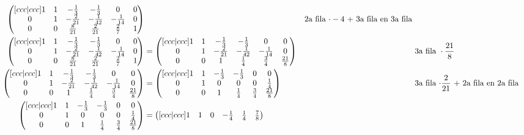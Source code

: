 \documentclass[letterpaper]{article}
\renewcommand{\*}{\cdot}
\theoremstyle{definition}
\begin{document}
\begin{align*}
\begin{pmatrix}[ccc|ccc]
	1 & 1 & -\frac{1}{3} & -\frac{1}{3} & 0 & 0\\
	0 & 1 & -\frac{2}{21} & -\frac{1}{42} & -\frac{1}{14} & 0\\
	0 & 0 & \frac{8}{21} & \frac{2}{21} & \frac{2}{7} & 1
	\end{pmatrix}  && \text{2a fila $ \* -4 $ + 3a fila en 3a fila } \\
	\begin{pmatrix}[ccc|ccc]
	1 & 1 & -\frac{1}{3} & -\frac{1}{3} & 0 & 0\\
	0 & 1 & -\frac{2}{21} & -\frac{1}{42} & -\frac{1}{14} & 0\\
	0 & 0 & \frac{8}{21} & \frac{2}{21} & \frac{2}{7} & 1
	\end{pmatrix}  & = \begin{pmatrix}[ccc|ccc]
	1 & 1 & -\frac{1}{3} & -\frac{1}{3} & 0 & 0\\
	0 & 1 & -\frac{2}{21} & -\frac{1}{42} & -\frac{1}{14} & 0\\
	0 & 0 & 1 & \frac{1}{4} & \frac{3}{4} & \frac{21}{8}
	\end{pmatrix}  && \text{3a fila } \* \frac{21}{8}\\
	\begin{pmatrix}[ccc|ccc]
	1 & 1 & -\frac{1}{3} & -\frac{1}{3} & 0 & 0\\
	0 & 1 & -\frac{2}{21} & -\frac{1}{42} & -\frac{1}{14} & 0\\
	0 & 0 & 1 & \frac{1}{4} & \frac{3}{4} & \frac{21}{8}
	\end{pmatrix} &= \begin{pmatrix}[ccc|ccc]
	1 & 1 & -\frac{1}{3} & -\frac{1}{3} & 0 & 0\\
	0 & 1 & 0 & 0 & 0 & \frac{1}{4}\\
	0 & 0 & 1 & \frac{1}{4} & \frac{3}{4} & \frac{21}{8}
	\end{pmatrix} && \text{3a fila $ \* \frac{2}{21} $ + 2a fila en 2a fila}\\
	\begin{pmatrix}[ccc|ccc]
	1 & 1 & -\frac{1}{3} & -\frac{1}{3} & 0 & 0\\
	0 & 1 & 0 & 0 & 0& \frac{1}{4}\\
	0 & 0 & 1 & \frac{1}{4} & \frac{3}{4} & \frac{21}{8}
	\end{pmatrix}  &= \begin{pmatrix}[ccc|ccc]
	1 & 1 & 0 & -\frac{1}{4} & \frac{1}{4} & \frac{7}{8} \\

\end{pmatrix}
\end{align*}
\end{document}
